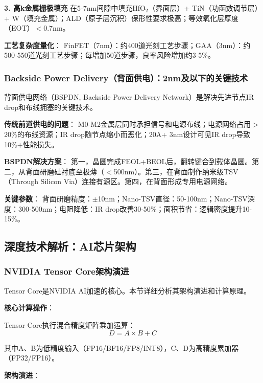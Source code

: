 \textbf{3. 高k金属栅极填充}
在5-7nm间隙中填充HfO$_2$（界面层）+ TiN（功函数调节层）+ W（填充金属）；ALD（原子层沉积）保形性要求极高；等效氧化层厚度（EOT）$<$0.7nm。

\textbf{工艺复杂度量化}：
FinFET（7nm）：约400道光刻工艺步骤；GAA（3nm）：约500-550道光刻工艺步骤；每增加50道步骤，良率风险增加约3-5\%。

\subsubsection{Backside Power Delivery（背面供电）：2nm及以下的关键技术}

背面供电网络（BSPDN, Backside Power Delivery Network）是解决先进节点IR drop和布线拥塞的关键技术\cite{Intel2024BSPDN, IEDM2024BSPDN}。

\textbf{传统前道供电的问题}：
M0-M2金属层同时承担信号和电源布线；电源网络占用$>$20\%的布线资源；IR drop随节点缩小而恶化；20A+ 3nm设计可见IR drop导致10\%+性能损失。

\textbf{BSPDN解决方案}：
第一，晶圆完成FEOL+BEOL后，翻转键合到载体晶圆。第二，从背面研磨硅衬底至极薄（$<$500nm）。第三，在背面制作纳米级TSV（Through Silicon Via）连接有源区。第四，在背面形成专用电源网络。

\textbf{关键参数}：
背面研磨精度：$\pm$10nm；Nano-TSV直径：50-100nm；Nano-TSV深度：300-500nm；电阻降低：IR drop改善30-50\%；面积节省：逻辑密度提升10-15\%。

\subsection{深度技术解析：AI芯片架构}

\subsubsection{NVIDIA Tensor Core架构演进}

Tensor Core是NVIDIA AI加速的核心。本节详细分析其架构演进和计算原理\cite{NVIDIABlackwell2024, HotChips2024NVIDIA}。

\textbf{核心计算操作}：

Tensor Core执行混合精度矩阵乘加运算：
\begin{equation}
D = A \times B + C
\end{equation}

其中A、B为低精度输入（FP16/BF16/FP8/INT8），C、D为高精度累加器（FP32/FP16）。

\textbf{架构演进}：

